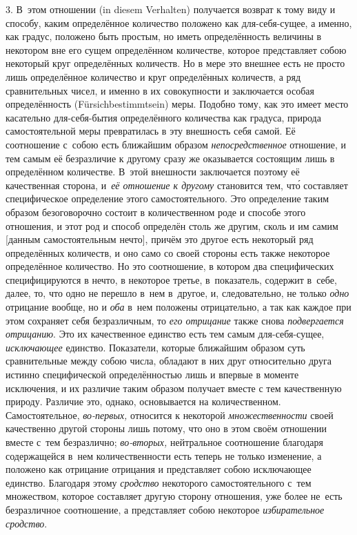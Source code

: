 3. В~этом отношении (in die\-sem Ver\-hal\-ten) получается возврат к тому виду
и способу, каким определённое количество положено как для-себя-сущее, а именно,
как градус, положено быть простым, но иметь определённость величины в некотором
вне его сущем определённом количестве, которое представляет собою некоторый
круг определённых количеств. Но в мере это внешнее есть не просто лишь
определённое количество и круг определённых количеств, а ряд сравнительных
чисел, и именно в их совокупности и заключается особая определённость
(Für\-sich\-bes\-timmt\-sein) меры. Подобно тому, как это имеет место
касательно для-себя-бытия определённого количества как градуса, природа
самостоятельной меры превратилась в эту внешность себя самой. Её соотношение
с~собою есть ближайшим образом {\em непосредственное} отношение, и тем самым её
безразличие к другому сразу же оказывается состоящим лишь в определённом
количестве. В~этой внешности заключается поэтому её качественная сторона,
и~{\em её отношение к другому} становится тем, чт\'{о} составляет специфическое
определение этого самостоятельного. Это определение таким образом безоговорочно
состоит в количественном роде и способе этого отношения, и этот род и способ
определён столь же другим, сколь и им самим [данным самостоятельным нечто],
причём это другое есть некоторый ряд определённых количеств, и оно само со
своей стороны есть также некоторое определённое количество. Но это соотношение,
в котором два специфических специфицируются в нечто, в некоторое третье,
в~показатель, содержит в~себе, далее, то, что одно не перешло в~нем в~другое,
и, следовательно, не только {\em одно} отрицание вообще, но и {\em оба} в~нем
положены отрицательно, а так как каждое при этом сохраняет себя безразличным,
то {\em его отрицание} также снова {\em подвергается отрицанию}. Это их
качественное единство есть тем самым для-себя-сущее, {\em исключающее}
единство. Показатели, которые ближайшим образом суть сравнительные между собою
числа, обладают в них друг относительно друга истинно специфической
определённостью лишь и впервые в моменте исключения, и их различие таким
образом получает вместе с тем качественную природу. Различие это, однако,
основывается на количественном. Самостоятельное, {\em во-первых,} относится к
некоторой {\em множественности} своей качественно другой стороны лишь потому,
что оно в этом своём отношении вместе с~тем безразлично; {\em во-вторых,}
нейтральное соотношение благодаря содержащейся в~нем количественности есть
теперь не только изменение, а положено как отрицание отрицания и представляет
собою исключающее единство. Благодаря этому {\em сродство} некоторого
самостоятельного с~тем множеством, которое составляет другую сторону отношения,
уже более не~есть безразличное соотношение, а представляет собою некоторое
{\em избирательное сродство}.

